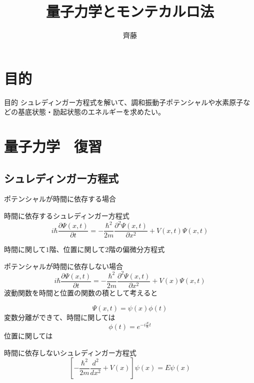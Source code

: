 \documentclass[dvipdfmx]{beamer}
\title{量子力学とモンテカルロ法}
\author{齊藤}
\begin{document}
\maketitle
\frame{\tableofcontents[hideallsubsections]}

\section{目的}
\begin{frame}{目的}
    シュレディンガー方程式を解いて、調和振動子ポテンシャルや水素原子などの基底状態・励起状態のエネルギーを求めたい。

\end{frame}


\section{量子力学　復習}
\subsection{シュレディンガー方程式}
\begin{frame}{\insertsubsection}
    ポテンシャルが時間に依存する場合
    \begin{block}{時間に依存するシュレディンガー方程式}
        \begin{equation}
            i\hbar\dfrac{\partial \Psi(x,t)}{\partial t} = -\dfrac{\hbar^2}{2m}\dfrac{\partial^2 \Psi(x,t)}{\partial x^2} + V(x,t)\Psi(x,t)
        \end{equation}
    \end{block}

    時間に関して$1$階、位置に関して$2$階の偏微分方程式
    \end{frame}

    \begin{frame}
    ポテンシャルが時間に依存しない場合
        \begin{equation}
            i\hbar\dfrac{\partial \Psi(x,t)}{\partial t} = -\dfrac{\hbar^2}{2m}\dfrac{\partial^2 \Psi(x,t)}{\partial x^2} + V(x)\Psi(x,t)
        \end{equation}
    波動関数を時間と位置の関数の積として考えると

        \begin{equation}
            \Psi(x,t) = \psi(x)\phi(t)
        \end{equation}
    変数分離ができて、時間に関しては
        \begin{equation}
            \phi(t) = e^{-i\frac{E}{\hbar}t}
        \end{equation}
    位置に関しては
    \begin{block}{時間に依存しないシュレディンガー方程式}
        \begin{equation}
            \left[-\dfrac{\hbar^2}{2m}\dfrac{d^2}{dx^2} + V(x)\right]\psi(x) = E\psi(x)
        \end{equation}
    \end{block}
    \end{frame}
\end{document}
